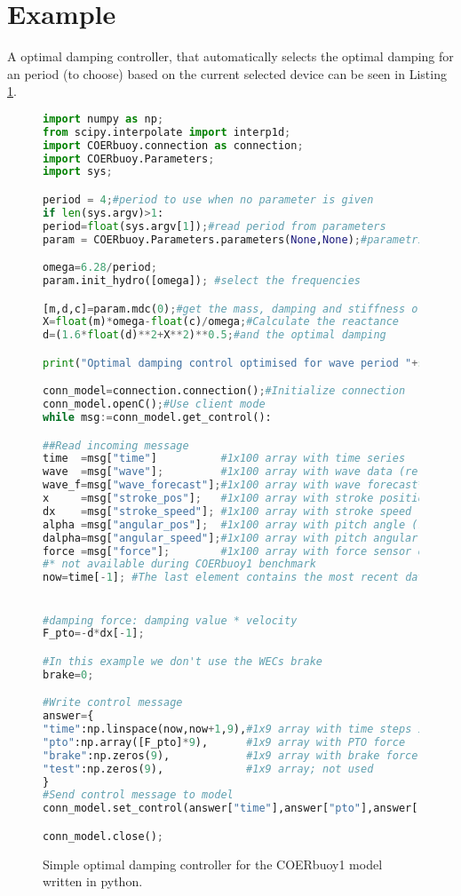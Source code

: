 \documentclass[oneside,10pt,a4paper]{book}
\begin{document}
\section{Example}
A optimal damping controller, that automatically selects the optimal damping for an period (to choose) based on the current selected device can be seen in Listing \ref{fig:controller_python}.
\begin{figure}
\begin{lstlisting}[language=Python,basicstyle=\small]
import numpy as np;
from scipy.interpolate import interp1d;
import COERbuoy.connection as connection;
import COERbuoy.Parameters;
import sys;

period = 4;#period to use when no parameter is given
if len(sys.argv)>1:
period=float(sys.argv[1]);#read period from parameters
param = COERbuoy.Parameters.parameters(None,None);#parametrise on base of the current buoy

omega=6.28/period;
param.init_hydro([omega]); #select the frequencies

[m,d,c]=param.mdc(0);#get the mass, damping and stiffness of the system
X=float(m)*omega-float(c)/omega;#Calculate the reactance
d=(1.6*float(d)**2+X**2)**0.5;#and the optimal damping

print("Optimal damping control optimised for wave period "+str(period)+" s.")

conn_model=connection.connection();#Initialize connection
conn_model.openC();#Use client mode
while msg:=conn_model.get_control():

##Read incoming message
time  =msg["time"]          #1x100 array with time series
wave  =msg["wave"];         #1x100 array with wave data (related to time series)*
wave_f=msg["wave_forecast"];#1x100 array with wave forecast*
x     =msg["stroke_pos"];   #1x100 array with stroke position (related to time series)
dx    =msg["stroke_speed"]; #1x100 array with stroke speed (related to time series)
alpha =msg["angular_pos"];  #1x100 array with pitch angle (related to time series)
dalpha=msg["angular_speed"];#1x100 array with pitch angular speed (related to time series)
force =msg["force"];        #1x100 array with force sensor data (related to time series)
#* not available during COERbuoy1 benchmark
now=time[-1]; #The last element contains the most recent data (except the wave forecast)


#damping force: damping value * velocity
F_pto=-d*dx[-1];

#In this example we don't use the WECs brake
brake=0;

#Write control message 
answer={
"time":np.linspace(now,now+1,9),#1x9 array with time steps in the future
"pto":np.array([F_pto]*9),      #1x9 array with PTO force
"brake":np.zeros(9),            #1x9 array with brake force
"test":np.zeros(9),             #1x9 array; not used
}
#Send control message to model
conn_model.set_control(answer["time"],answer["pto"],answer["brake"],answer["test"]);

conn_model.close();
\end{lstlisting}
\caption{Simple optimal damping controller for the COERbuoy1 model written in python.}\label{fig:controller_python}
\end{figure}
\end{document}
